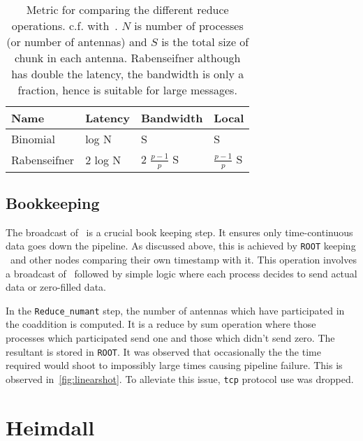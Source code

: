 \begin{table}
\end{table}
\begin{table}[]
	\label{tab:reducemetric}
	\begin{tabular}{@{}llll@{}}
		\toprule
		Name & Latency & Bandwidth & Local \\ \midrule
		Binomial & log N & S & S \\
		Rabenseifner & 2 log N & 2 $\frac{p-1}{p}$ S & $\frac{p-1}{p}$ S \\ \bottomrule
	\end{tabular}
	\caption{Metric for comparing the different reduce operations. c.f. with~\cite{raben}.
		$N$ is number of processes (or number of antennas) and $S$ is the total size of chunk in each antenna.
		Rabenseifner although has double the latency, the bandwidth is only a fraction, hence is suitable for large messages.
	}
\end{table}

\subsection{Bookkeeping}
\label{ssub:bcast}

\par The broadcast of \mjd~is a crucial book keeping step. It ensures only time-continuous data goes down the pipeline. 
As discussed above, this is achieved by \texttt{ROOT} keeping \mjd~and other nodes comparing their own timestamp with it.
This operation involves a broadcast of \float~followed by simple logic where each process decides to send actual data or zero-filled data.

\par In the \texttt{Reduce\_numant} step, the number of antennas which have participated in the coaddition is computed.
It is a reduce by sum operation where those processes which participated send one and those which didn't send zero.
The resultant is stored in \texttt{ROOT}.
It was observed that occasionally the the time required would shoot to impossibly large times causing pipeline failure.
This is observed in~\autoref{fig:linearshot}.
To alleviate this issue, \texttt{tcp} protocol use was dropped.


\section {Heimdall}

